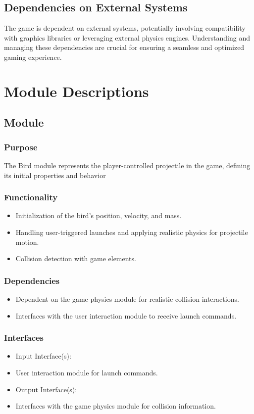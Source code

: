 \documentclass[12pt, titlepage]{article}
\begin{document}
\subsection{Dependencies on External Systems}
The game is dependent on external systems, potentially involving compatibility with graphics libraries or leveraging external physics engines. Understanding and managing these dependencies are crucial for ensuring a seamless and optimized gaming experience.

\section{Module Descriptions}
\subsection{Module}
\subsubsection{Purpose}
The Bird module represents the player-controlled projectile in the game, defining its initial properties and behavior
\subsubsection{Functionality}
\begin{itemize}
    \item Initialization of the bird's position, velocity, and mass.
    \item Handling user-triggered launches and applying realistic physics for projectile motion.
    \item Collision detection with game elements.
\end{itemize}

\subsubsection{Dependencies}
\begin{itemize}
\item Dependent on the game physics module for realistic collision interactions.
\item Interfaces with the user interaction module to receive launch commands.
\end{itemize}

\subsubsection{Interfaces}
\begin{itemize}
    \item Input Interface(s):
    \item User interaction module for launch commands.
    \item Output Interface(s):
    \item Interfaces with the game physics module for collision information.
\end{itemize}
\end{document}
